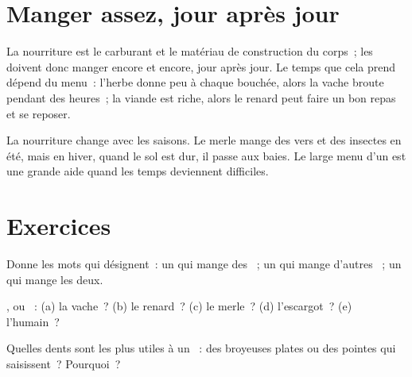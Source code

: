 \section{Manger assez, jour après jour}

\begin{proposition}\label{prop:g2:what-animals-eat:daily}
La nourriture est le carburant et le matériau de construction du
corps~; les  doivent donc manger encore et encore, jour après
jour. Le temps que cela prend dépend du menu~: l'herbe donne peu à
chaque bouchée, alors la vache broute pendant des heures~; la viande
est riche, alors le renard peut faire un bon repas et se reposer.
\end{proposition}
\admitted

\begin{example}\label{ex:g2:what-animals-eat:winter}
La nourriture change avec les saisons. Le merle mange des vers et
des insectes en été, mais en hiver, quand le sol est dur, il passe
aux baies. Le large menu d'un  est une grande aide quand les
temps deviennent difficiles.
\end{example}

\section{Exercices}

\begin{exercise}[$\star$]\label{exo:g2:what-animals-eat:1}
Donne les mots qui désignent~: un  qui mange des ~; un
 qui mange d'autres ~; un  qui mange les deux.
\end{exercise}

\begin{exercise}[$\star$]\label{exo:g2:what-animals-eat:2}
,  ou ~: (a) la vache~? (b) le renard~?
(c) le merle~? (d) l'escargot~? (e) l'humain~?
\end{exercise}

\begin{exercise}[$\star$]\label{exo:g2:what-animals-eat:3}
Quelles dents sont les plus utiles à un ~: des broyeuses
plates ou des pointes qui saisissent~? Pourquoi~?
\end{exercise}

